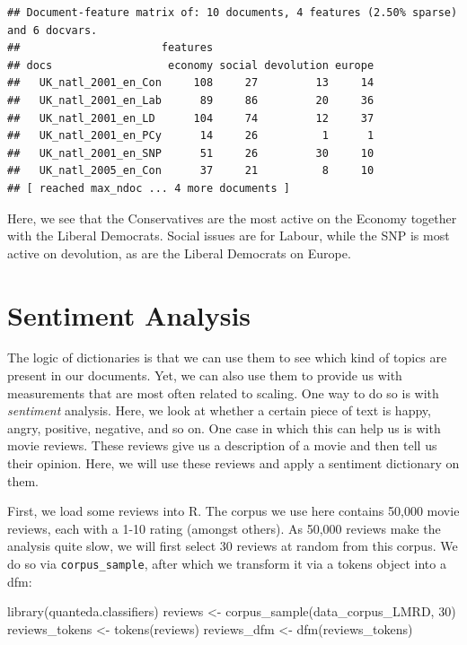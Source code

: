 \documentclass[
]{book}
\newenvironment{Shaded}{\begin{snugshade}}{\end{snugshade}}
\newcommand{\DecValTok}[1]{\textcolor[rgb]{0.00,0.00,0.81}{#1}}
\newcommand{\FunctionTok}[1]{\textcolor[rgb]{0.00,0.00,0.00}{#1}}
\newcommand{\NormalTok}[1]{#1}
\newcommand{\OtherTok}[1]{\textcolor[rgb]{0.56,0.35,0.01}{#1}}
\begin{document}
\begin{verbatim}
## Document-feature matrix of: 10 documents, 4 features (2.50% sparse) and 6 docvars.
##                      features
## docs                  economy social devolution europe
##   UK_natl_2001_en_Con     108     27         13     14
##   UK_natl_2001_en_Lab      89     86         20     36
##   UK_natl_2001_en_LD      104     74         12     37
##   UK_natl_2001_en_PCy      14     26          1      1
##   UK_natl_2001_en_SNP      51     26         30     10
##   UK_natl_2005_en_Con      37     21          8     10
## [ reached max_ndoc ... 4 more documents ]
\end{verbatim}

Here, we see that the Conservatives are the most active on the Economy together with the Liberal Democrats. Social issues are for Labour, while the SNP is most active on devolution, as are the Liberal Democrats on Europe.

\hypertarget{sentiment-analysis}{%
\section{Sentiment Analysis}\label{sentiment-analysis}}

The logic of dictionaries is that we can use them to see which kind of topics are present in our documents. Yet, we can also use them to provide us with measurements that are most often related to scaling. One way to do so is with \emph{sentiment} analysis. Here, we look at whether a certain piece of text is happy, angry, positive, negative, and so on. One case in which this can help us is with movie reviews. These reviews give us a description of a movie and then tell us their opinion. Here, we will use these reviews and apply a sentiment dictionary on them.

First, we load some reviews into R. The corpus we use here contains 50,000 movie reviews, each with a 1-10 rating (amongst others). As 50,000 reviews make the analysis quite slow, we will first select 30 reviews at random from this corpus. We do so via \texttt{corpus\_sample}, after which we transform it via a tokens object into a dfm:

\begin{Shaded}
\begin{Highlighting}[]
\FunctionTok{library}\NormalTok{(quanteda.classifiers)}
\NormalTok{reviews }\OtherTok{\textless{}{-}} \FunctionTok{corpus\_sample}\NormalTok{(data\_corpus\_LMRD, }\DecValTok{30}\NormalTok{)}
\NormalTok{reviews\_tokens }\OtherTok{\textless{}{-}} \FunctionTok{tokens}\NormalTok{(reviews)}
\NormalTok{reviews\_dfm }\OtherTok{\textless{}{-}} \FunctionTok{dfm}\NormalTok{(reviews\_tokens)}
\end{Highlighting}
\end{Shaded}
\end{document}

